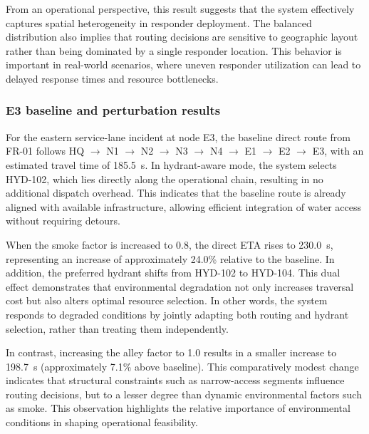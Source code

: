 From an operational perspective, this result suggests that the system effectively captures spatial heterogeneity in responder deployment. The balanced distribution also implies that routing decisions are sensitive to geographic layout rather than being dominated by a single responder location. This behavior is important in real-world scenarios, where uneven responder utilization can lead to delayed response times and resource bottlenecks.

\subsubsection{E3 baseline and perturbation results}
For the eastern service-lane incident at node E3, the baseline direct route from FR-01 follows
HQ $\rightarrow$ N1 $\rightarrow$ N2 $\rightarrow$ N3 $\rightarrow$ N4 $\rightarrow$ E1 $\rightarrow$ E2 $\rightarrow$ E3,
with an estimated travel time of 185.5~s. In hydrant-aware mode, the system selects HYD-102, which lies directly along the operational chain, resulting in no additional dispatch overhead. This indicates that the baseline route is already aligned with available infrastructure, allowing efficient integration of water access without requiring detours.


When the smoke factor is increased to 0.8, the direct ETA rises to 230.0~s, representing an increase of approximately 24.0\% relative to the baseline. In addition, the preferred hydrant shifts from HYD-102 to HYD-104. This dual effect demonstrates that environmental degradation not only increases traversal cost but also alters optimal resource selection. In other words, the system responds to degraded conditions by jointly adapting both routing and hydrant selection, rather than treating them independently.

In contrast, increasing the alley factor to 1.0 results in a smaller increase to 198.7~s (approximately 7.1\% above baseline). This comparatively modest change indicates that structural constraints such as narrow-access segments influence routing decisions, but to a lesser degree than dynamic environmental factors such as smoke. This observation highlights the relative importance of environmental conditions in shaping operational feasibility.

